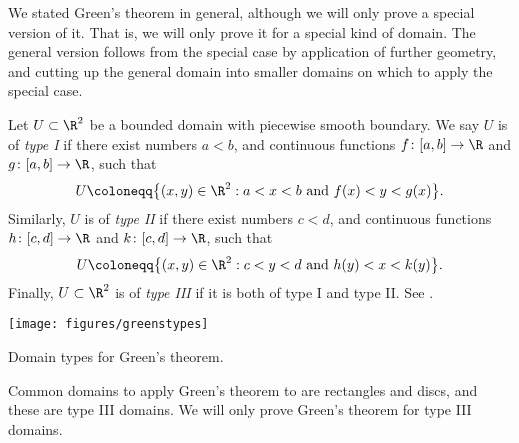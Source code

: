 We stated Green's theorem in general, although we will only prove a special 
version of it.  That is, we will only prove it for a special kind of domain.
The general version follows from the special case 
by application of further geometry, and cutting up the general
domain into smaller domains on which to apply the special case.

Let $U \subset \R^2$ be a bounded domain with piecewise smooth boundary.
We say $U$ is of \emph{type I}
if there exist numbers
$a < b$, and continuous
functions $f \colon [a,b] \to \R$ and
$g \colon [a,b] \to \R$, such that
\begin{equation*}
U \coloneqq \bigl\{ (x,y) \in \R^2 : a < x < b \text{ and } f(x) < y < g(x) \bigr\} .
\end{equation*}
Similarly, $U$ is of \emph{type II}
if there exist numbers
$c < d$, and continuous
functions $h \colon [c,d] \to \R$ and
$k \colon [c,d] \to \R$, such that
\begin{equation*}
U \coloneqq \bigl\{ (x,y) \in \R^2 : c < y < d \text{ and } h(y) < x < k(y) \bigr\} .
\end{equation*}
Finally, $U \subset \R^2$ is of \emph{type III}
if it is both of type I and type II\@.  See .

\begin{myfigureht}
\texttt{[image: figures/greenstypes]}
\caption{Domain types for Green's theorem.\label{fig:greenstypes}}
\end{myfigureht}

Common domains to apply Green's theorem to are rectangles and discs, and
these are type III domains.
We will only prove Green's theorem for type III domains.

